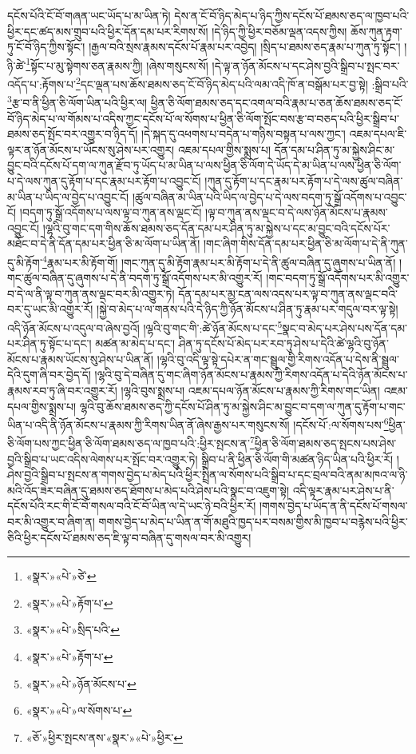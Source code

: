 དངོས་པོའི་ངོ་བོ་གཞན་ཡང་ཡོད་པ་མ་ཡིན་ཏེ། དེས་ན་ངོ་བོ་ཉིད་མེད་པ་ཉིད་ཀྱིས་དངོས་པོ་ཐམས་ཅད་ལ་ཁྱབ་པའི་ཕྱིར་དང་ཚད་མས་གྲུབ་པའི་ཕྱིར་དོན་དམ་པར་རིགས་སོ། །དེ་ཉིད་ཀྱི་ཕྱིར་བཅོམ་ལྡན་འདས་ཀྱིས། ཆོས་ཀུན་རྟག་ཏུ་ངོ་བོ་ཉིད་ཀྱིས་སྟོང་། །རྒྱལ་བའི་སྲས་རྣམས་དངོས་པོ་རྣམ་པར་འབྱེད། །སྲིད་པ་ཐམས་ཅད་རྣམ་པ་ཀུན་ཏུ་སྟོང་། །ཉི་ཚེ་\footnote{«སྣར་»«པེ་»ཙེ་}སྟོང་པ་མུ་སྟེགས་ཅན་རྣམས་ཀྱི། །ཞེས་གསུངས་སོ། །དེ་ལྟ་ན་ཉོན་མོངས་པ་དང་ཤེས་བྱའི་སྒྲིབ་པ་སྤང་བར་འདོད་པ་:རྟོགས་པ་\footnote{«སྣར་»«པེ་»རྟོག་པ་}དང་ལྡན་པས་ཆོས་ཐམས་ཅད་ངོ་བོ་ཉིད་མེད་པའི་ལམ་འདི་ཁོ་ན་བསྒོམ་པར་བྱ་སྟེ། :སྒྲིབ་པའི་\footnote{«སྣར་»«པེ་»སྲིད་པའི་}རྩ་བ་ནི་ཕྱིན་ཅི་ལོག་ཡིན་པའི་ཕྱིར་ལ། ཕྱིན་ཅི་ལོག་ཐམས་ཅད་དང་འགལ་བའི་རྣམ་པ་ཅན་ཆོས་ཐམས་ཅད་ངོ་བོ་ཉིད་མེད་པ་ལ་གོམས་པ་འདིས་ཀྱང་དངོས་པོ་ལ་སོགས་པ་ཕྱིན་ཅི་ལོག་སྤོང་བས་རྩ་བ་བཅད་པའི་ཕྱིར་སྒྲིབ་པ་ཐམས་ཅད་སྤོང་བར་འགྱུར་བ་ཉིད་དོ། །དེ་སྐད་དུ་འཕགས་པ་བདེན་པ་གཉིས་བསྟན་པ་ལས་ཀྱང་། འཇམ་དཔལ་ཇི་ལྟར་ན་ཉོན་མོངས་པ་ཡོངས་སུ་ཤེས་པར་འགྱུར། འཇམ་དཔལ་གྱིས་སྨྲས་པ། དོན་དམ་པ་ཤིན་ཏུ་མ་སྐྱེས་ཤིང་མ་བྱུང་བའི་དངོས་པོ་དག་ལ་ཀུན་རྫོབ་ཏུ་ཡོད་པ་མ་ཡིན་པ་ལས་ཕྱིན་ཅི་ལོག་དེ་ཡོད་དེ་མ་ཡིན་པ་ལས་ཕྱིན་ཅི་ལོག་པ་དེ་ལས་ཀུན་དུ་རྟོག་པ་དང་རྣམ་པར་རྟོག་པ་འབྱུང་ངོ། །ཀུན་དུ་རྟོག་པ་དང་རྣམ་པར་རྟོག་པ་དེ་ལས་ཚུལ་བཞིན་མ་ཡིན་པ་ཡིད་ལ་བྱེད་པ་འབྱུང་ངོ། །ཚུལ་བཞིན་མ་ཡིན་པའི་ཡིད་ལ་བྱེད་པ་དེ་ལས་བདག་ཏུ་སྒྲོ་འདོགས་པ་འབྱུང་ངོ། །བདག་ཏུ་སྒྲོ་འདོགས་པ་ལས་ལྟ་བ་ཀུན་ནས་ལྡང་ངོ། །ལྟ་བ་ཀུན་ནས་ལྡང་བ་དེ་ལས་ཉོན་མོངས་པ་རྣམས་འབྱུང་ངོ། །ལྷའི་བུ་གང་དག་གིས་ཆོས་ཐམས་ཅད་དོན་དམ་པར་ཤིན་ཏུ་མ་སྐྱེས་པ་དང་མ་བྱུང་བའི་དངོས་པོར་མཐོང་བ་དེ་ནི་དོན་དམ་པར་ཕྱིན་ཅི་མ་ལོག་པ་ཡིན་ནོ། །གང་ཞིག་གིས་དོན་དམ་པར་ཕྱིན་ཅི་མ་ལོག་པ་དེ་ནི་ཀུན་དུ་མི་རྟོག་\footnote{«སྣར་»«པེ་»རྟོག་པ་}རྣམ་པར་མི་རྟོག་གོ། །གང་ཀུན་དུ་མི་རྟོག་རྣམ་པར་མི་རྟོག་པ་དེ་ནི་ཚུལ་བཞིན་དུ་ཞུགས་པ་ཡིན་ནོ། །གང་ཚུལ་བཞིན་དུ་ཞུགས་པ་དེ་ནི་བདག་ཏུ་སྒྲོ་འདོགས་པར་མི་འགྱུར་རོ། །གང་བདག་ཏུ་སྒྲོ་འདོགས་པར་མི་འགྱུར་བ་དེ་ལ་ནི་ལྟ་བ་ཀུན་ནས་ལྡང་བར་མི་འགྱུར་ཏེ། དོན་དམ་པར་མྱ་ངན་ལས་འདས་པར་ལྟ་བ་ཀུན་ནས་ལྡང་བའི་བར་དུ་ཡང་མི་འགྱུར་རོ། །སྐྱེ་བ་མེད་པ་ལ་གནས་པའི་དེ་ཉིད་ཀྱི་ཉོན་མོངས་པ་ཤིན་ཏུ་རྣམ་པར་གདུལ་བར་ལྟ་སྟེ། འདི་ཉོན་མོངས་པ་འདུལ་བ་ཞེས་བྱའོ། །ལྷའི་བུ་གང་གི་:ཚེ་ཉོན་མོངས་པ་དང་\footnote{«སྣར་»«པེ་»ཉོན་མོངས་པ་}སྣང་བ་མེད་པར་ཤེས་པས་དོན་དམ་པར་ཤིན་ཏུ་སྟོང་པ་དང་། མཚན་མ་མེད་པ་དང་། ཤིན་ཏུ་དངོས་པོ་མེད་པར་རབ་ཏུ་ཤེས་པ་དེའི་ཚེ་ལྷའི་བུ་ཉོན་མོངས་པ་རྣམས་ཡོངས་སུ་ཤེས་པ་ཡིན་ནོ། །ལྷའི་བུ་འདི་ལྟ་སྟེ་དཔེར་ན་གང་སྦྲུལ་གྱི་རིགས་འདོན་པ་དེས་ནི་སྦྲུལ་དེའི་དུག་ཞི་བར་བྱེད་དོ། །ལྷའི་བུ་དེ་བཞིན་དུ་གང་ཞིག་ཉོན་མོངས་པ་རྣམས་ཀྱི་རིགས་འདོན་པ་དེའི་ཉོན་མོངས་པ་རྣམས་རབ་ཏུ་ཞི་བར་འགྱུར་རོ། །ལྷའི་བུས་སྨྲས་པ། འཇམ་དཔལ་ཉོན་མོངས་པ་རྣམས་ཀྱི་རིགས་གང་ཡིན། འཇམ་དཔལ་གྱིས་སྨྲས་པ། ལྷའི་བུ་ཆོས་ཐམས་ཅད་ཀྱི་དངོས་པོ་ཤིན་ཏུ་མ་སྐྱེས་ཤིང་མ་བྱུང་བ་དག་ལ་ཀུན་དུ་རྟོག་པ་གང་ཡིན་པ་འདི་ནི་ཉོན་མོངས་པ་རྣམས་ཀྱི་རིགས་ཡིན་ནོ་ཞེས་རྒྱས་པར་གསུངས་སོ། །དངོས་པོ་:ལ་སོགས་པས་\footnote{«སྣར་»«པེ་»ལ་སོགས་པ་}ཕྱིན་ཅི་ལོག་པས་ཀྱང་ཕྱིན་ཅི་ལོག་ཐམས་ཅད་ལ་ཁྱབ་པའི་:ཕྱིར་སྤངས་ན་\footnote{«ཅོ་»ཕྱིར་སྤངས་ནས་«སྣར་»«པེ་»ཕྱིར་}ཕྱིན་ཅི་ལོག་ཐམས་ཅད་སྤངས་པས་ཤེས་བྱའི་སྒྲིབ་པ་ཡང་འདིས་ལེགས་པར་སྤོང་བར་འགྱུར་ཏེ། སྒྲིབ་པ་ནི་ཕྱིན་ཅི་ལོག་གི་མཚན་ཉིད་ཡིན་པའི་ཕྱིར་རོ། །ཤེས་བྱའི་སྒྲིབ་པ་སྤངས་ན་གགས་བྱེད་པ་མེད་པའི་ཕྱིར་སྤྲིན་ལ་སོགས་པའི་སྒྲིབ་པ་དང་བྲལ་བའི་ནམ་མཁའ་ལ་ཉི་མའི་འོད་ཟེར་བཞིན་དུ་ཐམས་ཅད་ཐོགས་པ་མེད་པའི་ཤེས་པའི་སྣང་བ་འཇུག་སྟེ། འདི་ལྟར་རྣམ་པར་ཤེས་པ་ནི་དངོས་པོའི་རང་གི་ངོ་བོ་གསལ་བའི་ངོ་བོ་ཡིན་ལ་དེ་ཡང་ཉེ་བའི་ཕྱིར་རོ། །གགས་བྱེད་པ་ཡོད་ན་ནི་དངོས་པོ་གསལ་བར་མི་འགྱུར་བ་ཞིག་ན། གགས་བྱེད་པ་མེད་པ་ཡིན་ན་གོ་མཐུའི་ཁྱད་པར་བསམ་གྱིས་མི་ཁྱབ་པ་བརྙེས་པའི་ཕྱིར་ཅིའི་ཕྱིར་དངོས་པོ་ཐམས་ཅད་ཇི་ལྟ་བ་བཞིན་དུ་གསལ་བར་མི་འགྱུར། 